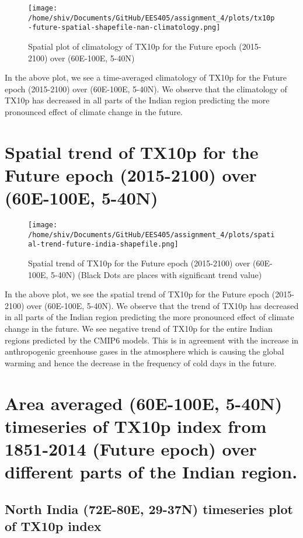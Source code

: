 \documentclass[a4paper, 12pt, twoside]{report}
\begin{document}
\begin{figure}[h]
    \centering
    \texttt{[image: /home/shiv/Documents/GitHub/EES405/assignment\_4/plots/tx10p-future-spatial-shapefile-nan-climatology.png]}
    \caption{\centering Spatial plot of climatology of TX10p for the Future epoch (2015-2100) over (60E-100E, 5-40N)}
    \label{fig:TX10p_future}
\end{figure}

In the above plot, we see a time-averaged climatology of TX10p for the Future epoch (2015-2100) over (60E-100E, 5-40N). We observe that the climatology of TX10p has decreased in all parts of the Indian region predicting the more pronounced effect of climate change in the future.

\newpage

\section{Spatial trend of TX10p for the Future epoch (2015-2100) over (60E-100E, 5-40N)}

\begin{figure}[h]
    \centering
    \texttt{[image: /home/shiv/Documents/GitHub/EES405/assignment\_4/plots/spatial-trend-future-india-shapefile.png]}
    \caption{\centering Spatial trend of TX10p for the Future epoch (2015-2100) over (60E-100E, 5-40N) (Black Dots are places with significant trend value)}
    \label{fig:TX10p_future_trend}
\end{figure}

In the above plot, we see the spatial trend of TX10p for the Future epoch (2015-2100) over (60E-100E, 5-40N). We observe that the trend of TX10p has decreased in all parts of the Indian region predicting the more pronounced effect of climate change in the future. We see negative trend of TX10p for the entire Indian regions predicted by the CMIP6 models. This is in agreement with the increase in anthropogenic greenhouse gases in the atmosphere which is causing the global warming and hence the decrease in the frequency of cold days in the future.
\section{Area averaged (60E-100E, 5-40N) timeseries of TX10p index from 1851-2014 (Future epoch) over different parts of the Indian region.}

\subsection{North India (72E-80E, 29-37N) timeseries plot of TX10p index}
\end{document}
